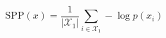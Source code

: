 \documentclass[letterpaper]{article} %
\theoremstyle{acmdefinition}
\begin{document}
\[
\text{SPP}(x)=\frac{1}{|\mathcal{X}_{1}|}\sum_{i \in \mathcal{X}_{1}} -\log p(x_i) 
\]
\end{document}
